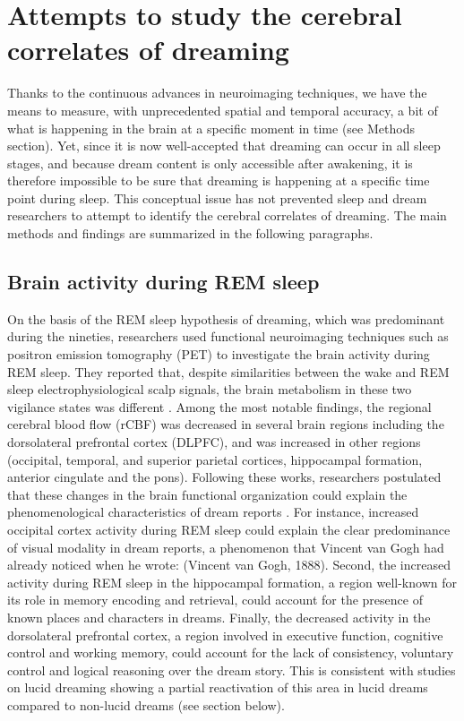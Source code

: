 \section{Attempts to study the cerebral correlates of dreaming}
\label{sec:dream-research:attempts}

Thanks to the continuous advances in neuroimaging techniques, we have the means to measure, with unprecedented spatial and temporal accuracy, a bit of what is happening in the brain at a specific moment in time (see Methods section). Yet, since it is now well-accepted that dreaming can occur in all sleep stages, and because dream content is only accessible after awakening, it is therefore impossible to be sure that dreaming is happening at a specific time point during sleep. This conceptual issue has not prevented sleep and dream researchers to attempt to identify the cerebral correlates of dreaming. The main methods and findings are summarized in the following paragraphs.

\subsection{Brain activity during REM sleep}
\label{sec:dream-research:attempts:ba-rem}

On the basis of the REM sleep hypothesis of dreaming, which was predominant during the nineties, researchers used functional neuroimaging techniques such as positron emission tomography (PET) to investigate the brain activity during REM sleep. They reported that, despite similarities between the wake and REM sleep electrophysiological scalp signals, the brain metabolism in these two vigilance states was different \citep{maquet_functional_1996, braun_regional_1997}. Among the most notable findings, the regional cerebral blood flow (rCBF) was decreased in several brain regions including the dorsolateral prefrontal cortex (DLPFC), and was increased in other regions (occipital, temporal, and superior parietal cortices, hippocampal formation, anterior cingulate and the pons). Following these works, researchers postulated that these changes in the brain functional organization could explain the phenomenological characteristics of dream reports \citep{hobson_dreaming_2000, schwartz_sleep_2002, maquet_human_2005, nir_dreaming_2010, ruby_experimental_2011}. For instance, increased occipital cortex activity during REM sleep could explain the clear predominance of visual modality in dream reports, a phenomenon that Vincent van Gogh had already noticed when he wrote:  (Vincent van Gogh, 1888). Second, the increased activity during REM sleep in the hippocampal formation, a region well-known for its role in memory encoding and retrieval, could account for the presence of known places and characters in dreams. Finally, the decreased activity in the dorsolateral prefrontal cortex, a region involved in executive function, cognitive control and working memory, could account for the lack of consistency, voluntary control and logical reasoning over the dream story. This is consistent with studies on lucid dreaming showing a partial reactivation of this area in lucid dreams compared to non-lucid dreams (see section below).


